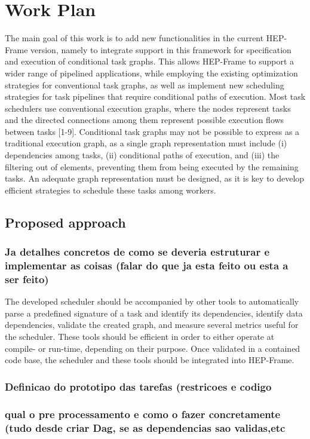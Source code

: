\chapter{Work Plan}

The main goal of this work is to add new functionalities in the current HEP-Frame version, namely to integrate support in this framework for specification and execution of conditional task graphs. This allows HEP-Frame to support a wider range of pipelined applications, while employing the existing optimization strategies for conventional task graphs, as well as implement new scheduling strategies for task pipelines that require conditional paths of execution.
Most task schedulers use conventional execution graphs, where  the nodes represent tasks and the directed connections among them represent possible execution flows between tasks [1-9]. Conditional task graphs may not be possible to express as a traditional execution graph, as a single graph representation must include (i) dependencies among tasks, (ii) conditional paths of execution, and (iii) the filtering out of elements, preventing them from being executed by the remaining tasks. An adequate graph representation must be designed, as it is key to develop efficient strategies to schedule these tasks among workers.

\section{Proposed approach}
\subsection{Ja detalhes concretos de como se deveria estruturar e implementar as coisas (falar do que ja esta feito ou esta a ser feito)}

The developed scheduler should be accompanied by other tools to automatically parse a predefined signature of a task and identify its dependencies, identify data dependencies, validate the created graph, and measure several metrics useful for the scheduler. These tools should be efficient in order to either operate at compile- or run-time, depending on their purpose. Once validated in a contained code base, the scheduler and these tools should be integrated into HEP-Frame.
\subsection{Definicao do prototipo das tarefas (restricoes e codigo}
\subsection{qual o pre processamento e como o fazer concretamente (tudo desde criar Dag, se as dependencias sao validas,etc}
